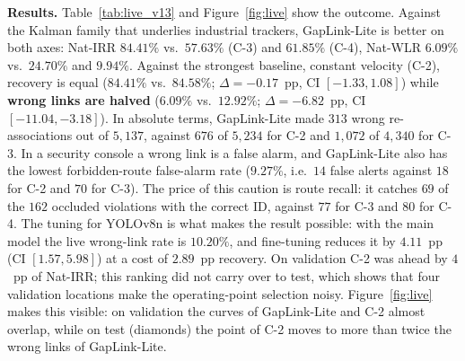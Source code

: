\textbf{Results.} Table~\ref{tab:live_v13} and Figure~\ref{fig:live} show the outcome. Against the Kalman family that underlies industrial trackers, GapLink-Lite is better on both axes: Nat-IRR $\mathbf{84.41\%}$ vs.\ $57.63\%$ (C-3) and $61.85\%$ (C-4), Nat-WLR $\mathbf{6.09\%}$ vs.\ $24.70\%$ and $9.94\%$. Against the strongest baseline, constant velocity (C-2), recovery is equal ($84.41\%$ vs.\ $84.58\%$; $\Delta = -0.17$~pp, CI $[-1.33, 1.08]$) while \textbf{wrong links are halved} ($6.09\%$ vs.\ $12.92\%$; $\Delta = -6.82$~pp, CI $[-11.04, -3.18]$). In absolute terms, GapLink-Lite made $313$ wrong re-associations out of $5{,}137$, against $676$ of $5{,}234$ for C-2 and $1{,}072$ of $4{,}340$ for C-3. In a security console a wrong link is a false alarm, and GapLink-Lite also has the lowest forbidden-route false-alarm rate ($9.27\%$, i.e.\ $14$ false alerts against $18$ for C-2 and $70$ for C-3). The price of this caution is route recall: it catches $69$ of the $162$ occluded violations with the correct ID, against $77$ for C-3 and $80$ for C-4. The tuning for YOLOv8n is what makes the result possible: with the main model the live wrong-link rate is $10.20\%$, and fine-tuning reduces it by $4.11$~pp (CI $[1.57, 5.98]$) at a cost of $2.89$~pp recovery. On validation C-2 was ahead by $4$~pp of Nat-IRR; this ranking did not carry over to test, which shows that four validation locations make the operating-point selection noisy. Figure~\ref{fig:live} makes this visible: on validation the curves of GapLink-Lite and C-2 almost overlap, while on test (diamonds) the point of C-2 moves to more than twice the wrong links of GapLink-Lite.


